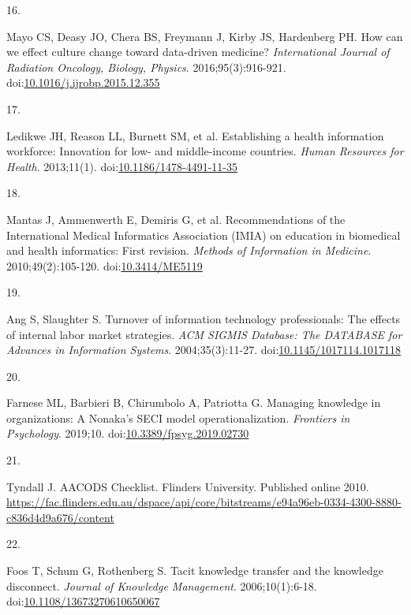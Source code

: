 \documentclass[
  american,
  11pt,
  letterpaper,
  oneside  ,captions=tableheading
]{scrartcl}
\newlength{\cslhangindent}
\newlength{\csllabelwidth}
\newenvironment{CSLReferences}[2] %
 {\begin{list}{}{%
  \setlength{\itemindent}{0pt}
  \setlength{\leftmargin}{0pt}
  \setlength{\parsep}{0pt}
  \ifodd #1
   \setlength{\leftmargin}{\cslhangindent}
   \setlength{\itemindent}{-1\cslhangindent}
  \fi
  \setlength{\itemsep}{#2\baselineskip}}}
 {\end{list}}
\newcommand{\CSLLeftMargin}[1]{\parbox[t]{\csllabelwidth}{\strut#1\strut}}
\newcommand{\CSLRightInline}[1]{\parbox[t]{\linewidth - \csllabelwidth}{\strut#1\strut}}
\begin{document}
\begin{CSLReferences}{0}{1}
\CSLLeftMargin{16. }%
\CSLRightInline{Mayo CS, Deasy JO, Chera BS, Freymann J, Kirby JS,
Hardenberg PH. {How can we effect culture change toward data-driven
medicine?} \emph{International Journal of Radiation Oncology, Biology,
Physics}. 2016;95(3):916-921.
doi:\href{https://doi.org/10.1016/j.ijrobp.2015.12.355}{10.1016/j.ijrobp.2015.12.355}}

\CSLLeftMargin{17. }%
\CSLRightInline{Ledikwe JH, Reason LL, Burnett SM, et al. {Establishing
a health information workforce: Innovation for low- and middle-income
countries}. \emph{Human Resources for Health}. 2013;11(1).
doi:\href{https://doi.org/10.1186/1478-4491-11-35}{10.1186/1478-4491-11-35}}

\CSLLeftMargin{18. }%
\CSLRightInline{Mantas J, Ammenwerth E, Demiris G, et al.
{Recommendations of the International Medical Informatics Association
(IMIA) on education in biomedical and health informatics: First
revision}. \emph{Methods of Information in Medicine}.
2010;49(2):105-120.
doi:\href{https://doi.org/10.3414/ME5119}{10.3414/ME5119}}

\CSLLeftMargin{19. }%
\CSLRightInline{Ang S, Slaughter S. {Turnover of information technology
professionals: The effects of internal labor market strategies}.
\emph{{ACM} {SIGMIS} Database: The {DATABASE} for Advances in
Information Systems}. 2004;35(3):11-27.
doi:\href{https://doi.org/10.1145/1017114.1017118}{10.1145/1017114.1017118}}

\CSLLeftMargin{20. }%
\CSLRightInline{Farnese ML, Barbieri B, Chirumbolo A, Patriotta G.
{Managing knowledge in organizations: A Nonaka's {SECI} model
operationalization}. \emph{Frontiers in Psychology}. 2019;10.
doi:\href{https://doi.org/10.3389/fpsyg.2019.02730}{10.3389/fpsyg.2019.02730}}

\CSLLeftMargin{21. }%
\CSLRightInline{Tyndall J. {{AACODS} Checklist. Flinders University}.
Published online 2010.
\url{https://fac.flinders.edu.au/dspace/api/core/bitstreams/e94a96eb-0334-4300-8880-c836d4d9a676/content}}

\CSLLeftMargin{22. }%
\CSLRightInline{Foos T, Schum G, Rothenberg S. {Tacit knowledge transfer
and the knowledge disconnect}. \emph{Journal of Knowledge Management}.
2006;10(1):6-18.
doi:\href{https://doi.org/10.1108/13673270610650067}{10.1108/13673270610650067}}


\end{CSLReferences}
\end{document}

